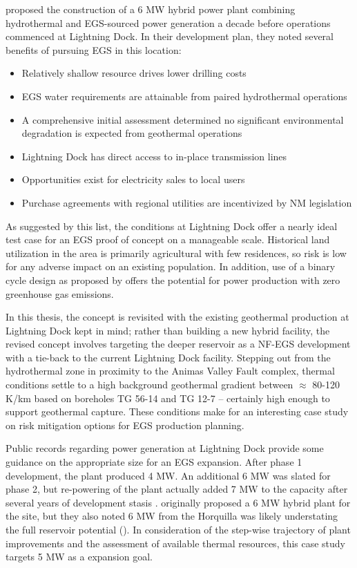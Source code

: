 \citet{schochet_development_2001} proposed the construction of a 6 MW hybrid power plant combining hydrothermal and EGS-sourced power generation a decade before operations commenced at Lightning Dock. In their development plan, they noted several benefits of pursuing EGS in this location:
\begin{itemize}[itemsep=2pt]\label{ch4:ld_egs_support}
    \item Relatively shallow resource drives lower drilling costs
    \item EGS water requirements are attainable from paired hydrothermal operations
    \item A comprehensive initial assessment determined no significant environmental degradation is expected from geothermal operations
    \item Lightning Dock has direct access to in-place transmission lines  
    \item Opportunities exist for electricity sales to local users
    \item Purchase agreements with regional utilities are incentivized by NM legislation
\end{itemize}

As suggested by this list, the conditions at Lightning Dock offer a nearly ideal test case for an EGS proof of concept on a manageable scale. Historical land utilization in the area is primarily agricultural with few residences, so risk is low for any adverse impact on an existing population. In addition, use of a binary cycle design as proposed by \citet{schochet_development_2001} offers the potential for power production with zero greenhouse gas emissions.  

In this thesis, the \citeauthor{schochet_development_2001} concept is revisited with the existing geothermal production at Lightning Dock kept in mind; rather than building a new hybrid facility, the revised concept involves targeting the deeper reservoir as a NF-EGS development with a tie-back to the current Lightning Dock facility. Stepping out from the hydrothermal zone in proximity to the Animas Valley Fault complex, thermal conditions settle to a high background geothermal gradient between $\approx$ 80-120 K/km based on boreholes TG 56-14 and TG 12-7 \citep{cunniff_final_2003} -- certainly high enough to support geothermal capture. These conditions make for an interesting case study on risk mitigation options for EGS production planning.

Public records regarding power generation at Lightning Dock provide some guidance on the appropriate size for an EGS expansion. After phase 1 development, the plant produced 4 MW. An additional 6 MW was slated for phase 2, but re-powering of the plant actually added 7 MW to the capacity after several years of development stasis \citep{think_geoenergy_turboden_2020}. \citeauthor{schochet_development_2001} originally proposed a 6 MW hybrid plant for the site, but they also noted 6 MW from the Horquilla was likely understating the full reservoir potential (\citeyear{schochet_development_2001}). In consideration of the step-wise trajectory of plant improvements and the assessment of available thermal resources, this case study targets 5 MW as a expansion goal. 

